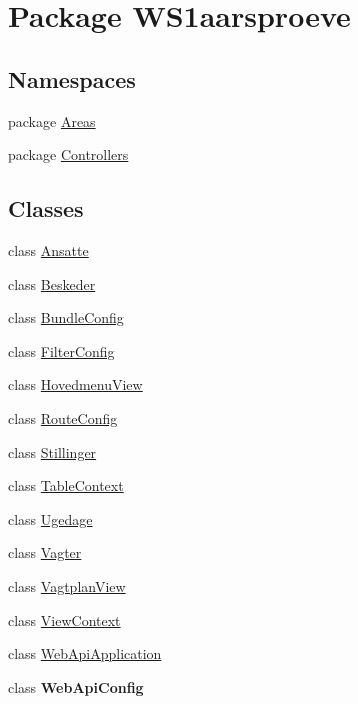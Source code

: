 \hypertarget{namespace_w_s1aarsproeve}{}\section{Package W\+S1aarsproeve}
\label{namespace_w_s1aarsproeve}
\subsection*{Namespaces}
\begin{DoxyCompactItemize}
\item 
package \hyperlink{namespace_w_s1aarsproeve_1_1_areas}{Areas}
\item 
package \hyperlink{namespace_w_s1aarsproeve_1_1_controllers}{Controllers}
\end{DoxyCompactItemize}
\subsection*{Classes}
\begin{DoxyCompactItemize}
\item 
class \hyperlink{class_w_s1aarsproeve_1_1_ansatte}{Ansatte}
\item 
class \hyperlink{class_w_s1aarsproeve_1_1_beskeder}{Beskeder}
\item 
class \hyperlink{class_w_s1aarsproeve_1_1_bundle_config}{Bundle\+Config}
\item 
class \hyperlink{class_w_s1aarsproeve_1_1_filter_config}{Filter\+Config}
\item 
class \hyperlink{class_w_s1aarsproeve_1_1_hovedmenu_view}{Hovedmenu\+View}
\item 
class \hyperlink{class_w_s1aarsproeve_1_1_route_config}{Route\+Config}
\item 
class \hyperlink{class_w_s1aarsproeve_1_1_stillinger}{Stillinger}
\item 
class \hyperlink{class_w_s1aarsproeve_1_1_table_context}{Table\+Context}
\item 
class \hyperlink{class_w_s1aarsproeve_1_1_ugedage}{Ugedage}
\item 
class \hyperlink{class_w_s1aarsproeve_1_1_vagter}{Vagter}
\item 
class \hyperlink{class_w_s1aarsproeve_1_1_vagtplan_view}{Vagtplan\+View}
\item 
class \hyperlink{class_w_s1aarsproeve_1_1_view_context}{View\+Context}
\item 
class \hyperlink{class_w_s1aarsproeve_1_1_web_api_application}{Web\+Api\+Application}
\item 
class {\bfseries Web\+Api\+Config}
\end{DoxyCompactItemize}
